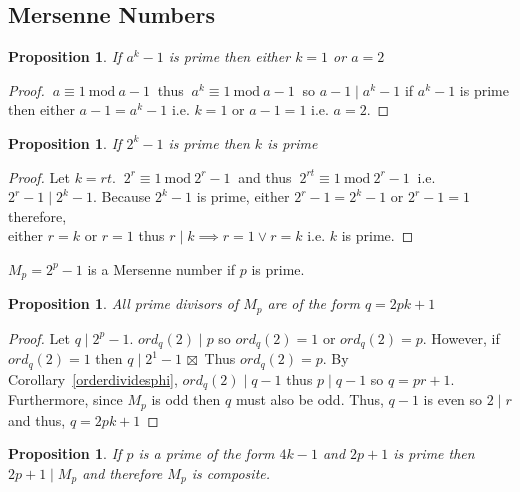 \documentclass[12pt]{extarticle}
\renewcommand\qedsymbol{$\square$}
\newcommand{\cont}{$\boxtimes$}
\newcommand{\divides}{\mid}
\newtheorem{proposition}[theorem]{Proposition}
\newenvironment{definition}[1][Definition:]{\begin{trivlist}
\item[\hskip \labelsep {\bfseries #1}]}{\end{trivlist}}
\newenvironment{lproof}{\begin{proof} \renewcommand{\qedsymbol}{}}{\end{proof}}
\renewcommand{\mod}[3]{\: #1 \equiv #2 \: \mathrm{mod} \: #3 \:}
\begin{document}
\newpage

\subsection{Mersenne Numbers}

\begin{proposition}
If $a^k - 1$ is prime then either $k = 1$ or $a = 2$ 
\end{proposition}

\begin{proof}
$\mod{a}{1}{a-1}$ thus $\mod{a^k}{1}{a-1}$ so $a-1 \divides a^k-1$ if $a^k-1$ is prime then either $a-1 = a^k-1$ i.e. $k = 1$ or $a - 1 = 1$ i.e. $a = 2$.
\end{proof}

\begin{proposition}
If $2^k - 1$ is prime then $k$ is prime
\end{proposition}

\begin{lproof}
Let $k = rt$. $\mod{2^r}{1}{2^r-1}$ and thus $\mod{2^{rt}}{1}{2^r-1}$ i.e. $2^r - 1 \divides 2^k - 1$. Because $2^k - 1$ is prime, either $2^r - 1 = 2^k - 1$ or $2^r - 1 = 1$ therefore, \\ either $r= k$ or $r = 1$ thus $r \divides k \implies r = 1 \vee r = k$ i.e. $k$ is prime.
\end{lproof}

\begin{definition}
$M_p = 2^p - 1$ is a Mersenne number if $p$ is prime. 
\end{definition}

\begin{proposition}
\label{mersennedivisorlemma}
All prime divisors of $M_p$ are of the form $q = 2pk + 1$
\end{proposition}

\begin{lproof}
Let $q \divides 2^p - 1$. $ord_q(2) \divides p$ so $ord_q(2) = 1$ or $ord_q(2) = p$. However, if $ord_q(2) = 1$ then $q \divides 2^1-1$ \cont\ Thus $ord_q(2) = p$. By Corollary~\ref{orderdividesphi}, $ord_q(2) \divides q-1$ thus $p \divides q-1$ so $q = pr + 1$. Furthermore, since $M_p$ is odd then $q$ must also be odd. Thus, $q-1$ is even so $2 \divides r$ and thus, $q = 2pk + 1$
\end{lproof}

\begin{proposition}
If $p$ is a prime of the form $4k - 1$ and $2p + 1$ is prime then $2p + 1 \divides M_p$ and therefore $M_p$ is composite.  
\end{proposition}
\end{document}
